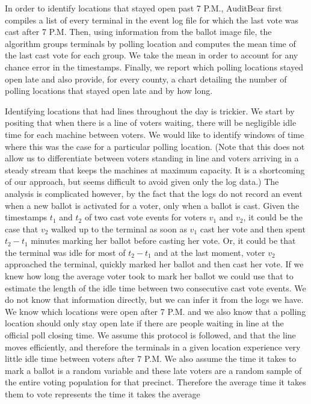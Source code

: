 \documentclass[letterpaper,twocolumn,10pt]{article}
\begin{document}
In order to 
identify locations that stayed open past 7
P.M., AuditBear first compiles a list of every terminal in the event log file
for which the last vote was cast after 7 P.M. Then, using information from the
ballot image file, the algorithm groups terminals by polling location and
computes the mean time of the last cast vote for each group. We take the mean in
order to account for any chance error in the timestamps. Finally, we report which
polling locations stayed open late and also provide, for every county, a chart
detailing the number of polling locations that stayed open late and by how
long. 
	 		
Identifying locations that had lines throughout the day is trickier. We start by
positing that when there is a line of voters waiting, there will be negligible
idle time for each machine between voters. We would like to identify windows of
time where this was the case for a particular polling location. (Note that this
does not allow us to differentiate between voters standing in line and voters
arriving in a steady stream that keeps the machines at maximum capacity. It is a
shortcoming of our approach, but seems difficult to avoid given only the log
data.) The analysis is complicated however, by the fact that the logs do not
record an event when a new ballot is activated for a voter, only when a ballot
is cast. Given the timestamps $t_1$ and $t_2$ of two cast vote events for voters
$v_1$ and $v_2$, it could be the case that $v_2$ walked up to the terminal
as soon as $v_1$ cast her vote and then spent $t_2-t_1$ minutes marking her
ballot before casting her vote. Or, it could be that the terminal was idle for
most of $t_2-t_1$ and at the last moment, voter $v_2$ approached the terminal,
quickly marked her ballot and then cast her vote. If we knew how long the
average voter took to mark her ballot we could use that to estimate the length
of the idle time between two consecutive cast vote events. We do not know that
information directly, but we can infer it from the logs we have. We know which
locations were open after 7 P.M. and we also know that a polling location should
only stay open late if there are people waiting in line at the official poll
closing time. We assume this protocol is followed, and that
the line moves efficiently, and therefore the terminals in a given location
experience very little idle time between voters after 7 P.M. We also assume
the time it takes to mark a ballot is a random variable and these late voters
are a random sample of the entire voting population for that precinct. Therefore
the average time it takes them to vote represents the time it takes the average
\end{document}
